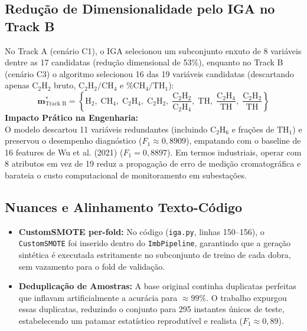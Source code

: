 \documentclass[11pt,a4paper]{article}
\begin{document}
\subsection{Redução de Dimensionalidade pelo IGA no Track B}
No Track A (cenário C1), o IGA selecionou um subconjunto enxuto de 8 variáveis dentre as 17 candidatas (redução dimensional de 53\%), enquanto no Track B (cenário C3) o algoritmo selecionou 16 das 19 variáveis candidatas (descartando apenas $\text{C}_2\text{H}_2$ bruto, $\text{C}_2\text{H}_2/\text{CH}_4$ e $\% \text{CH}_4/\text{TH}_1$):
\begin{equation}
  \mathbf{m}^*_{\text{Track B}} = \left\{ \text{H}_2, \; \text{CH}_4, \; \text{C}_2\text{H}_4, \; \text{C}_2\text{H}_2, \; \frac{\text{C}_2\text{H}_2}{\text{C}_2\text{H}_4}, \; \text{TH}, \; \frac{\text{C}_2\text{H}_4}{\text{TH}}, \; \frac{\text{C}_2\text{H}_2}{\text{TH}} \right\}
\end{equation}
\textbf{Impacto Prático na Engenharia:}\\
O modelo descartou 11 variáveis redundantes (incluindo $\text{C}_2\text{H}_6$ e frações de $\text{TH}_1$) e preservou o desempenho diagnóstico ($F_1 \approx 0{,}8909$), empatando com o baseline de 16 features de Wu et al. (2021) ($F_1 = 0{,}8897$). Em termos industriais, operar com 8 atributos em vez de 19 reduz a propagação de erro de medição cromatográfica e barateia o custo computacional de monitoramento em subestações.

\subsection{Nuances e Alinhamento Texto-Código}
\begin{itemize}
  \item \textbf{CustomSMOTE per-fold:} No código (\texttt{iga.py}, linhas 150--156), o \texttt{CustomSMOTE} foi inserido dentro do \texttt{ImbPipeline}, garantindo que a geração sintética é executada estritamente no subconjunto de treino de cada dobra, sem vazamento para o fold de validação.
  \item \textbf{Deduplicação de Amostras:} A base original continha duplicatas perfeitas que inflavam artificialmente a acurácia para $\approx 99\%$. O trabalho expurgou essas duplicatas, reduzindo o conjunto para 295 instantes únicos de teste, estabelecendo um patamar estatístico reprodutível e realista ($F_1 \approx 0{,}89$).
\end{itemize}

\vspace{0.4cm}
\end{document}
